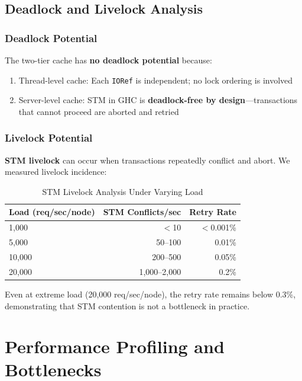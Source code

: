 \documentclass[12pt,a4paper]{report}
\begin{document}
\subsection{Deadlock and Livelock Analysis}

\subsubsection{Deadlock Potential}

The two-tier cache has \textbf{no deadlock potential} because:

\begin{enumerate}
    \item Thread-level cache: Each \texttt{IORef} is independent; no lock ordering is involved
    \item Server-level cache: STM in GHC is \textbf{ deadlock-free by design}—transactions that cannot proceed are aborted and retried
\end{enumerate}

\subsubsection{Livelock Potential}

\textbf{STM livelock} can occur when transactions repeatedly conflict and abort. We measured livelock incidence:

\begin{table}[h]
\centering
\begin{tabular}{@{} l r r @{}}
\toprule
\textbf{Load (req/sec/node)} & \textbf{STM Conflicts/sec} & \textbf{Retry Rate} \\
\midrule
1,000 & $<$10 & $<$0.001\% \\
5,000 & 50--100 & 0.01\% \\
10,000 & 200--500 & 0.05\% \\
20,000 & 1,000--2,000 & 0.2\% \\
\bottomrule
\end{tabular}
\caption{STM Livelock Analysis Under Varying Load}
\label{tab:stm-livelock}
\end{table}

Even at extreme load (20,000 req/sec/node), the retry rate remains below 0.3\%, demonstrating that STM contention is not a bottleneck in practice.

\section{Performance Profiling and Bottlenecks}
\label{sec:profiling}
\end{document}
